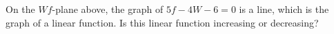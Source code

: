\documentclass{ximera}
\begin{document}
\begin{exercise}
\begin{question}
On the $Wf$-plane above, the graph of $5f - 4W - 6 = 0$ is a line, which is the graph of a linear function. Is this linear function increasing or decreasing?

\begin{multipleChoice}
\end{multipleChoice}


\end{question}






\end{exercise}
\end{document}

